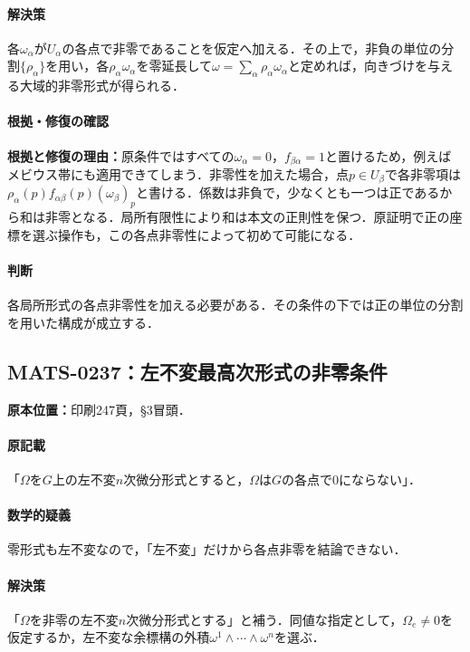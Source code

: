 \documentclass[a4paper,10pt]{ltjsarticle}
\begin{document}
\paragraph{解決策}各$\omega_\alpha$が$U_\alpha$の各点で非零であることを仮定へ加える．その上で，非負の単位の分割$\{\rho_\alpha\}$を用い，各$\rho_\alpha\omega_\alpha$を零延長して$\omega=\sum_\alpha\rho_\alpha\omega_\alpha$と定めれば，向きづけを与える大域的非零形式が得られる．

\paragraph{根拠・修復の確認}\textbf{根拠と修復の理由：}原条件ではすべての$\omega_\alpha=0$，$f_{\beta\alpha}=1$と置けるため，例えばメビウス帯にも適用できてしまう．非零性を加えた場合，点$p\in U_\beta$で各非零項は$\rho_\alpha(p)f_{\alpha\beta}(p)(\omega_\beta)_p$と書ける．係数は非負で，少なくとも一つは正であるから和は非零となる．局所有限性により和は本文の正則性を保つ．原証明で正の座標を選ぶ操作も，この各点非零性によって初めて可能になる．

\paragraph{判断}各局所形式の各点非零性を加える必要がある．その条件の下では正の単位の分割を用いた構成が成立する．


\subsection*{MATS-0237：左不変最高次形式の非零条件}\label{math:MATS-0237}
\noindent\textbf{原本位置：}印刷247頁，§3冒頭．

\paragraph{原記載}「$\Omega$を$G$上の左不変$n$次微分形式とすると，$\Omega$は$G$の各点で0にならない」．

\paragraph{数学的疑義}零形式も左不変なので，「左不変」だけから各点非零を結論できない．

\paragraph{解決策}「$\Omega$を非零の左不変$n$次微分形式とする」と補う．同値な指定として，$\Omega_e\ne0$を仮定するか，左不変な余標構の外積$\omega^1\wedge\cdots\wedge\omega^n$を選ぶ．
\end{document}
